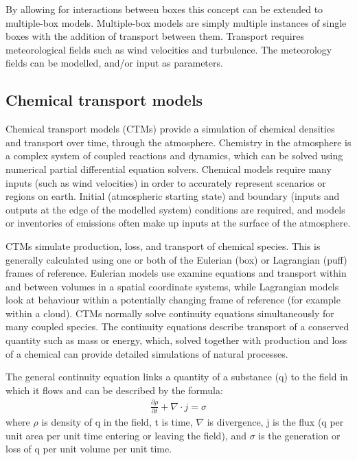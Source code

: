     By allowing for interactions between boxes this concept can be extended to multiple-box models.
    Multiple-box models are simply multiple instances of single boxes with the addition of transport between them.
    Transport requires meteorological fields such as wind velocities and turbulence.
    The meteorology fields can be modelled, and/or input as parameters.
  
  
  \subsection{Chemical transport models}
    \label{LR:Models:ctm}
    Chemical transport models (CTMs) provide a simulation of chemical densities and transport over time, through the atmosphere.
    Chemistry in the atmosphere is a complex system of coupled reactions and dynamics, which can be solved using numerical partial differential equation solvers.
    Chemical models require many inputs (such as wind velocities) in order to accurately represent scenarios or regions on earth.
    Initial (atmospheric starting state) and boundary (inputs and outputs at the edge of the modelled system) conditions are required, and models or inventories of emissions often make up inputs at the surface of the atmosphere.
    
    
    CTMs simulate production, loss, and transport of chemical species.
    This is generally calculated using one or both of the Eulerian (box) or Lagrangian (puff) frames of reference.
    Eulerian models use examine equations and transport within and between volumes in a spatial coordinate systems, while Lagrangian models look at behaviour within a potentially changing frame of reference (for example within a cloud).
    CTMs normally solve continuity equations simultaneously for many coupled species.
    The continuity equations describe transport of a conserved quantity such as mass or energy, which, solved together with production and loss of a chemical can provide detailed simulations of natural processes.
    
    The general continuity equation links a quantity of a substance (q) to the field in which it flows and can be described by the formula:
    \begin{align*}
      \frac{\partial \rho}{\partial t} + \nabla \cdot j = \sigma 
    \end{align*}
    where $\rho$ is density of q in the field, t is time, $\nabla$ is divergence, j is the flux (q per unit area per unit time entering or leaving the field), and $\sigma$ is the generation or loss of q per unit volume per unit time.
    
